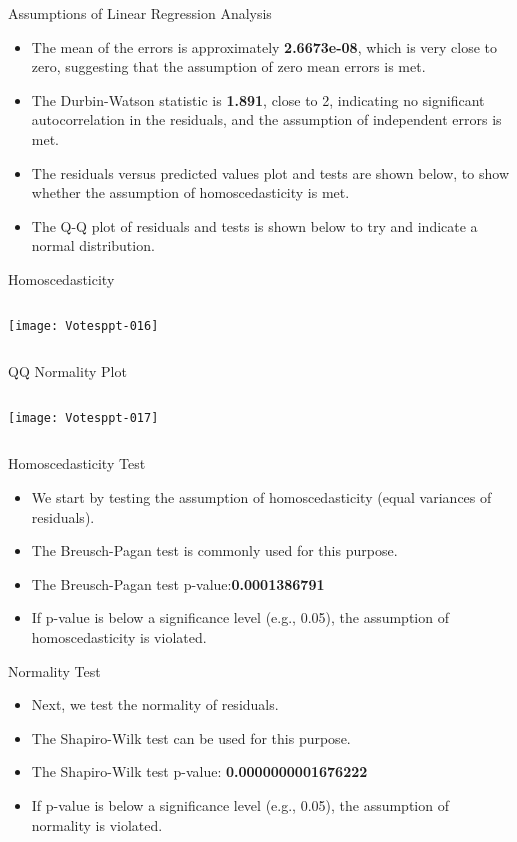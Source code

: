 \documentclass{beamer}
\begin{document}
\begin{frame}{Assumptions of Linear Regression Analysis}
\begin{itemize}
\item The mean of the errors is approximately \textbf{2.6673e-08}, which is very close to zero, suggesting that the assumption of zero mean errors is met.
\item The Durbin-Watson statistic is \textbf{1.891}, close to 2, indicating no significant autocorrelation in the residuals, and the assumption of independent errors is met.
\item The residuals versus predicted values plot and tests are shown below, to show whether the assumption of homoscedasticity is met.
\item The  Q-Q plot of residuals and tests is shown below to try and indicate a normal distribution.
\end{itemize}
\end{frame}

\begin{frame}[fragile]{Homoscedasticity}
\begin{columns}[c] %
\texttt{[image: Votesppt-016]}
\end{columns}
\end{frame}

\begin{frame}[fragile]{QQ Normality Plot}
\begin{columns}[c] %
\texttt{[image: Votesppt-017]}
\end{columns}
\end{frame}


\begin{frame}{Homoscedasticity Test}
\begin{itemize}
\item We start by testing the assumption of homoscedasticity (equal variances of residuals).
\item The Breusch-Pagan test is commonly used for this purpose.
\item The Breusch-Pagan test p-value:\textbf{0.0001386791}
\item If p-value is below a significance level (e.g., 0.05), the assumption of homoscedasticity is violated.
\end{itemize}
\end{frame}

\begin{frame}{Normality Test}
\begin{itemize}
\item Next, we test the normality of residuals.
\item The Shapiro-Wilk test can be used for this purpose.
\item The Shapiro-Wilk test p-value: \textbf{0.0000000001676222}
\item If p-value is below a significance level (e.g., 0.05), the assumption of normality is violated.
\end{itemize}
\end{frame}
\end{document}
